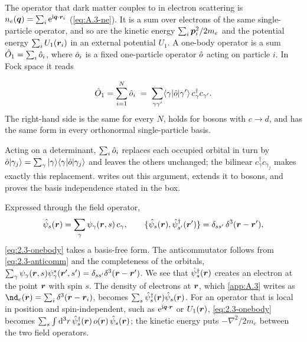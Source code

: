 The operator that dark matter couples to in electron scattering is $n_e(\bm{q}) = \sum_i\mathrm{e}^{\mathrm{i}\bm{q}\cdot\bm{r}_i}$ (\cref{eq:A.3-ne}). It is a sum over electrons of the same single-particle operator, and so are the kinetic energy $\sum_i\bm{p}_i^2/2m_e$ and the potential energy $\sum_i U_1(\bm{r}_i)$ in an external potential $U_1$. A one-body operator is a sum $\hat{O}_1 = \sum_i\hat{o}_i$, where $\hat{o}_i$ is a fixed one-particle operator $\hat{o}$ acting on particle $i$. In Fock space it reads
\begin{keyresult}
\begin{equation}
  \hat{O}_1 = \sum_{i=1}^{N}\hat{o}_i \;=\; \sum_{\gamma\gamma'}\langle\gamma|\hat{o}|\gamma'\rangle\,c^\dagger_\gamma c_{\gamma'} .
  \label{eq:2.3-onebody}
\end{equation}
The right-hand side is the same for every $N$, holds for bosons with $c \to d$, and has the same form in every orthonormal single-particle basis.
\end{keyresult}
Acting on a determinant, $\sum_i\hat{o}_i$ replaces each occupied orbital in turn by $\hat{o}|\gamma_j\rangle = \sum_\gamma|\gamma\rangle\langle\gamma|\hat{o}|\gamma_j\rangle$ and leaves the others unchanged; the bilinear $c^\dagger_\gamma c_{\gamma_j}$ makes exactly this replacement.  writes out this argument, extends it to bosons, and proves the basis independence stated in the box.

Expressed through the field operator,
\begin{equation}
  \hat{\psi}_s(\bm{r}) = \sum_\gamma\psi_\gamma(\bm{r}, s)\,c_\gamma ,
  \qquad \{\hat{\psi}_s(\bm{r}), \hat{\psi}^\dagger_{s'}(\bm{r}')\} = \delta_{ss'}\,\delta^3(\bm{r} - \bm{r}') ,
  \label{eq:2.3-field}
\end{equation}
\cref{eq:2.3-onebody} takes a basis-free form. The anticommutator follows from \cref{eq:2.3-anticomm} and the completeness of the orbitals, $\sum_\gamma\psi_\gamma(\bm{r}, s)\psi^*_\gamma(\bm{r}', s') = \delta_{ss'}\delta^3(\bm{r} - \bm{r}')$. We see that $\hat{\psi}^\dagger_s(\bm{r})$ creates an electron at the point $\bm{r}$ with spin $s$. The density of electrons at $\bm{r}$, which \cref{app:A.3} writes as $\nd_e(\vect{r}) = \sum_i\delta^3(\vect{r} - \vect{r}_i)$, becomes $\sum_s\hat{\psi}^\dagger_s(\bm{r})\hat{\psi}_s(\bm{r})$. For an operator that is local in position and spin-independent, such as $\mathrm{e}^{\mathrm{i}\bm{q}\cdot\bm{r}}$ or $U_1(\bm{r})$, \cref{eq:2.3-onebody} becomes $\sum_s\int\mathrm{d}^3r\,\hat{\psi}^\dagger_s(\bm{r})\,o(\bm{r})\,\hat{\psi}_s(\bm{r})$; the kinetic energy puts $-\nabla^2/2m_e$ between the two field operators.

